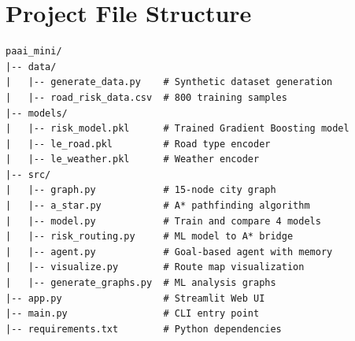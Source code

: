 \documentclass[12pt,a4paper]{report}
\begin{document}
\chapter{Project File Structure}
\begin{lstlisting}
paai_mini/
|-- data/
|   |-- generate_data.py    # Synthetic dataset generation
|   |-- road_risk_data.csv  # 800 training samples
|-- models/
|   |-- risk_model.pkl      # Trained Gradient Boosting model
|   |-- le_road.pkl         # Road type encoder
|   |-- le_weather.pkl      # Weather encoder
|-- src/
|   |-- graph.py            # 15-node city graph
|   |-- a_star.py           # A* pathfinding algorithm
|   |-- model.py            # Train and compare 4 models
|   |-- risk_routing.py     # ML model to A* bridge
|   |-- agent.py            # Goal-based agent with memory
|   |-- visualize.py        # Route map visualization
|   |-- generate_graphs.py  # ML analysis graphs
|-- app.py                  # Streamlit Web UI
|-- main.py                 # CLI entry point
|-- requirements.txt        # Python dependencies
\end{lstlisting}
\end{document}
